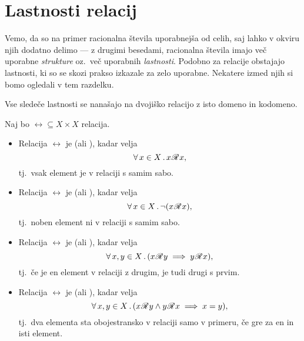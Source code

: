 	
	\section{Lastnosti relacij}\label{RAZDELEK: Lastnosti relacij}
	
		Vemo, da so na primer racionalna števila uporabnejša od celih, saj lahko v okviru njih dodatno delimo --- z drugimi besedami, racionalna števila imajo več uporabne \emph{strukture} oz.~več uporabnih \emph{lastnosti}. Podobno za relacije obstajajo lastnosti, ki so se skozi prakso izkazale za zelo uporabne. Nekatere izmed njih si bomo ogledali v tem razdelku.
		
		Vse sledeče lastnosti se nanašajo na dvojiško relacijo z isto domeno in kodomeno.
		
		\begin{definicija}
			Naj bo $\rel \subseteq X \times X$ relacija.
			\begin{itemize}
				\item
					Relacija $\rel$ je  (ali ), kadar velja
					\[\xall{x}[X]{x \rel x},\]
					tj.~vsak element je v relaciji s samim sabo.
				\item
					Relacija $\rel$ je  (ali ), kadar velja
					\[\xall{x}[X]{\lnot(x \rel x)},\]
					tj.~noben element ni v relaciji s samim sabo.
				\item
					Relacija $\rel$ je  (ali ), kadar velja
					\[\all{x, y}[X]{x \rel y \implies y \rel x},\]
					tj.~če je en element v relaciji z drugim, je tudi drugi s prvim.
				\item
					Relacija $\rel$ je  (ali ), kadar velja
					\[\all{x, y}[X]{x \rel y \land y \rel x \implies x = y},\]
					tj.~dva elementa sta obojestransko v relaciji samo v primeru, če gre za en in isti element.
					

\end{itemize}
\end{definicija}
